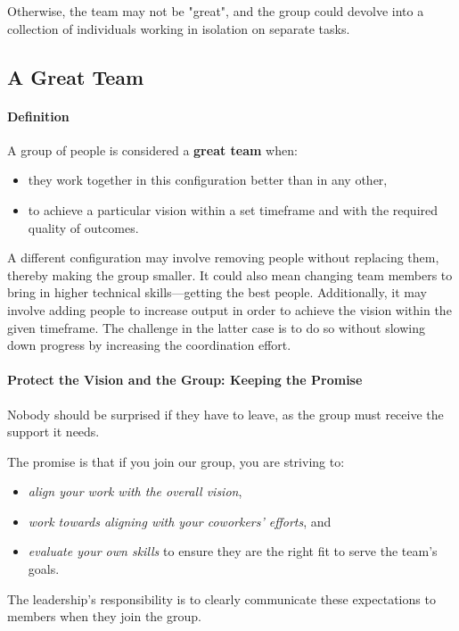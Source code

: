 Otherwise, the team may not be "great", and the group could devolve into a collection of individuals working in isolation on separate tasks.

\subsection{A Great Team} \label{responsibility__great}

\paragraph{Definition}
A group of people is considered a \textbf{great team} when:
\begin{itemize}
	\item they work together in this configuration better than in any other,
	\item to achieve a particular vision within a set timeframe and with the required quality of outcomes.
\end{itemize}

A different configuration may involve removing people without replacing them, thereby making the group smaller. It could also mean changing team members to bring in higher technical skills—getting the best people. Additionally, it may involve adding people to increase output in order to achieve the vision within the given timeframe. The challenge in the latter case is to do so without slowing down progress by increasing the coordination effort.

\paragraph{Protect the Vision and the Group: Keeping the Promise}
\begin{center}
	Nobody should be surprised if they have to leave, as the group must receive the support it needs.
\end{center}
The promise is that if you join our group, you are striving to:
\begin{itemize}
	\item \textit{align your work with the overall vision},
	\item \textit{work towards aligning with your coworkers' efforts}, and
	\item \textit{evaluate your own skills} to ensure they are the right fit to serve the team's goals.
\end{itemize}
The leadership's responsibility is to clearly communicate these expectations to members when they join the group.\\

